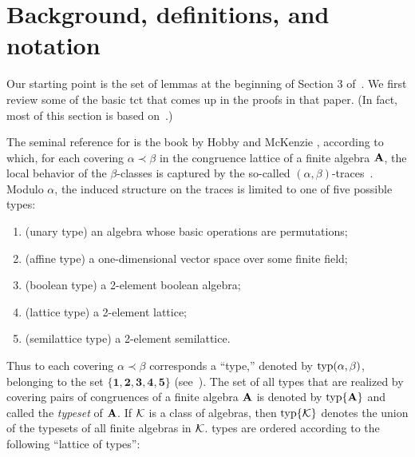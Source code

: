 

\section{Background, definitions, and notation}
\label{sec:defin-notat}
Our starting point is the set of lemmas at the beginning of Section 3 of~\cite{Freese:2009}.
We first review some of the basic \ac{tct}
that comes up in the proofs in that paper. (In fact, most of this section
is based on~\cite[Section~2]{Freese:2009}.)

The seminal reference for \tct is the book by Hobby and McKenzie
\cite{HM:1988}, according to which,
for each covering $\alpha \prec \beta$ in the congruence lattice of a finite
algebra $\mathbf{A}$, the local behavior of the $\beta$-classes is captured by the
so-called $(\alpha, \beta)$-traces~\cite[Def.~2.15]{HM:1988}.
Modulo $\alpha$, the induced structure on the traces is limited to one
of five possible types:

\begin{enumerate}[{\bf 1}]
\item  (unary type) an algebra whose basic operations are permutations;
\item  (affine type) a one-dimensional vector space over some finite field;
\item  (boolean type) a 2-element boolean algebra;
\item  (lattice type) a 2-element lattice;
\item  (semilattice type) a 2-element semilattice.
\end{enumerate}

Thus to each covering $\alpha \prec \beta$
corresponds a ``\tct type,'' denoted by $\operatorname{typ}(\alpha, \beta)$,
belonging to the set
$\{\mathbf{1},\mathbf{2},\mathbf{3},\mathbf{4},\mathbf{5}\}$
(see~\cite[Def.~5.1]{HM:1988}).
The set of all \tct types that are realized by covering pairs of congruences of a
finite algebra $\mathbf{A}$ is denoted by $\operatorname{typ}\{\mathbf{A}\}$
and called the \emph{typeset} of $\mathbf{A}$.
If $\mathcal{K}$ is a class of algebras, then $\operatorname{typ}\{\mathcal{K}\}$ denotes the union of the typesets of all finite algebras in $\mathcal{K}$.
\tct types are ordered according to the following ``lattice of types'':

